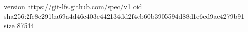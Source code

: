 version https://git-lfs.github.com/spec/v1
oid sha256:2fc8c291ba69a4d46c403e442134dd2f4cb60b3905594d88d1e6cd9ae4279b91
size 87544
